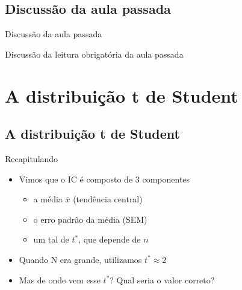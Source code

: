 \documentclass{beamer}
\begin{document}
\subsection{Discussão da aula passada}

\begin{frame}{Discussão da aula passada}
  \begin{block}{}
    Discussão da leitura obrigatória da aula passada
  \end{block}
\end{frame}

\section[t de Student]{A distribuição t de Student}

\subsection{A distribuição t de Student}

\begin{frame}{Recapitulando}
  \begin{itemize}
  \item Vimos que o IC é composto de 3 componentes
    \begin{itemize}
    \item a média $\bar{x}$ (tendência central)
    \item o erro padrão da média (SEM)
    \item um tal de $t^{*}$, que depende de $n$
    \end{itemize}
  \item Quando N era grande, utilizamos $t^{*} \approx 2$
    \bigskip
  \item Mas de onde vem esse $t^{*}$? Qual seria o valor correto?
  \end{itemize}
\end{frame}
\end{document}
